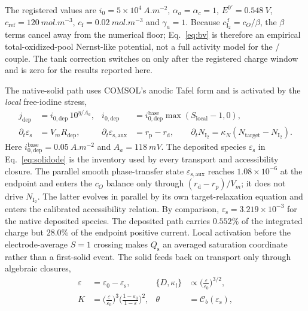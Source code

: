 \documentclass[11pt]{article}
\newcommand{\cf}{c_{\mathrm{I_2}}^{\,\mathrm{f}}}
\newcommand{\epss}{\varepsilon_{\mathrm{s}}}
\newcommand{\epsl}{\varepsilon}
\begin{document}
The registered values are $i_0=5\times10^{4}~\si{A.m^{-2}}$, $\alpha_a=\alpha_c=1$,
$E^{0\prime}=\SI{0.548}{V}$, $c_{\mathrm{ref}}=\SI{120}{mol.m^{-3}}$,
$c_{\mathrm f}=\SI{0.02}{mol.m^{-3}}$ and $\gamma_a=1$. Because $\cf=c_O/\beta$, the $\beta$ terms cancel
away from the numerical floor; Eq.~\eqref{eq:bv} is therefore an empirical total-oxidized-pool Nernst-like
potential, not a full activity model for the / couple. The tank correction switches on only
after the registered charge window and is zero for the results reported here.

The native-solid path uses COMSOL's anodic Tafel form and is activated by the \emph{local} free-iodine stress,
\begin{equation}
\begin{aligned}
j_{\mathrm{dep}}&=i_{0,\mathrm{dep}}\,10^{\eta/A_a}, &
i_{0,\mathrm{dep}}&=i_{0,\mathrm{dep}}^{\mathrm{base}}\max(S_{\mathrm{local}}-1,0),\\
\partial_t\epss&=V_mR_{\mathrm{dep}}, &
\partial_t\varepsilon_{\mathrm{s,aux}}&=r_{\mathrm p}-r_{\mathrm d},\qquad
\partial_tN_{\mathrm{I_2}}=\kappa_N(N_{\mathrm{target}}-N_{\mathrm{I_2}}).
\end{aligned}
\label{eq:solidode}
\end{equation}
Here $i_{0,\mathrm{dep}}^{\mathrm{base}}=\SI{0.05}{A.m^{-2}}$ and $A_a=\SI{118}{mV}$. The deposited
species $\epss$ in Eq.~\eqref{eq:solidode} is the inventory used by every transport and accessibility closure.
The parallel smooth phase-transfer state $\varepsilon_{\mathrm{s,aux}}$ reaches
$1.08\times10^{-6}$ at the endpoint and enters the $c_O$ balance only through
$(r_{\mathrm d}-r_{\mathrm p})/V_m$; it does not drive $N_{\mathrm{I_2}}$. The latter evolves in parallel by
its own target-relaxation equation and enters the calibrated accessibility relation. By comparison,
$\epss=3.219\times10^{-3}$ for the native deposited species. The deposited path carries $0.552\%$ of the
integrated charge but $28.0\%$ of the endpoint positive current. Local activation before the electrode-average
$S=1$ crossing makes $Q_{\mathrm s}$ an averaged saturation coordinate rather than a first-solid event. The solid
feeds back on transport only through algebraic closures,
\begin{equation}
\begin{aligned}
\epsl&=\varepsilon_0-\epss, &
\{D,\kappa_l\}&\propto\Big(\tfrac{\epsl}{\varepsilon_0}\Big)^{3/2},\\
K&=\Big(\tfrac{\epsl}{\varepsilon_0}\Big)^{3}
\Big(\tfrac{1-\varepsilon_0}{1-\epsl}\Big)^{2}, &
\theta&=\mathcal{C}_{b}(\epss),
\end{aligned}
\label{eq:feedback}
\end{equation}
\end{document}

